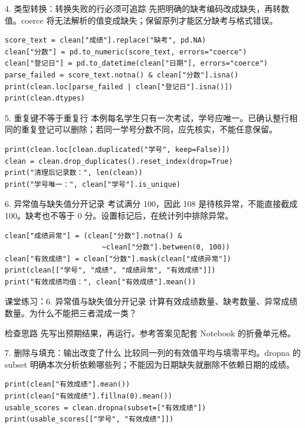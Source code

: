 \documentclass[9pt]{ctexbeamer}
\begin{document}
\begin{frame}[fragile]{4. 类型转换：转换失败的行必须可追踪}
\small 先把明确的缺考编码改成缺失，再转数值。coerce 将无法解析的值变成缺失；保留原列才能区分缺考与格式错误。
\medskip
\begin{lstlisting}
score_text = clean["成绩"].replace("缺考", pd.NA)
clean["分数"] = pd.to_numeric(score_text, errors="coerce")
clean["登记日"] = pd.to_datetime(clean["日期"], errors="coerce")
parse_failed = score_text.notna() & clean["分数"].isna()
print(clean.loc[parse_failed | clean["登记日"].isna()])
print(clean.dtypes)
\end{lstlisting}
\end{frame}

\begin{frame}[fragile]{5. 重复键不等于重复行}
\small 本例每名学生只有一次考试，学号应唯一。已确认整行相同的重复登记可以删除；若同一学号分数不同，应先核实，不能任意保留。
\medskip
\begin{lstlisting}
print(clean.loc[clean.duplicated("学号", keep=False)])
clean = clean.drop_duplicates().reset_index(drop=True)
print("清理后记录数：", len(clean))
print("学号唯一：", clean["学号"].is_unique)
\end{lstlisting}
\end{frame}

\begin{frame}[fragile]{6. 异常值与缺失值分开记录}
\small 考试满分 100，因此 108 是待核异常，不能直接截成 100。缺考也不等于 0 分。设置标记后，在统计列中排除异常。
\medskip
\begin{lstlisting}
clean["成绩异常"] = (clean["分数"].notna() &
                       ~clean["分数"].between(0, 100))
clean["有效成绩"] = clean["分数"].mask(clean["成绩异常"])
print(clean[["学号", "成绩", "成绩异常", "有效成绩"]])
print("有效成绩均值：", clean["有效成绩"].mean())
\end{lstlisting}
\end{frame}
\begin{frame}[fragile]{课堂练习：6. 异常值与缺失值分开记录}
计算有效成绩数量、缺考数量、异常成绩数量。为什么不能把三者混成一类？
\medskip
\begin{block}{检查思路}
先写出预期结果，再运行。参考答案见配套 Notebook 的折叠单元格。
\end{block}
\end{frame}

\begin{frame}[fragile]{7. 删除与填充：输出改变了什么}
\small 比较同一列的有效值平均与填零平均。dropna 的 subset 明确本次分析依赖哪些列；不能因为日期缺失就删除不依赖日期的成绩。
\medskip
\begin{lstlisting}
print(clean["有效成绩"].mean())
print(clean["有效成绩"].fillna(0).mean())
usable_scores = clean.dropna(subset=["有效成绩"])
print(usable_scores[["学号", "有效成绩"]])
\end{lstlisting}
\end{frame}
\end{document}
